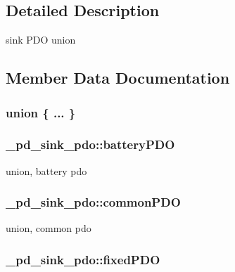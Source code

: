 \subsection{Detailed Description}
sink P\-D\-O union 

\subsection{Member Data Documentation}
\hypertarget{struct__pd__sink__pdo_a9bc2f094f51753cea6adc85552fa8100}{\subsubsection[{"@39}]{\setlength{\rightskip}{0pt plus 5cm}union \{ ... \} }}\label{struct__pd__sink__pdo_a9bc2f094f51753cea6adc85552fa8100}
\hypertarget{struct__pd__sink__pdo_adb7ddc7d4451cd6fe0f6eb13ebce229e}{
\subsubsection[{battery\-P\-D\-O}]{ \-\_\-pd\-\_\-sink\-\_\-pdo\-::battery\-P\-D\-O}}\label{struct__pd__sink__pdo_adb7ddc7d4451cd6fe0f6eb13ebce229e}
union, battery pdo \hypertarget{struct__pd__sink__pdo_a8f6789929499a63a1326708206e016c5}{
\subsubsection[{common\-P\-D\-O}]{ \-\_\-pd\-\_\-sink\-\_\-pdo\-::common\-P\-D\-O}}\label{struct__pd__sink__pdo_a8f6789929499a63a1326708206e016c5}
union, common pdo \hypertarget{struct__pd__sink__pdo_aebd2d1f5078757ee9a4c3d836e0df136}{
\subsubsection[{fixed\-P\-D\-O}]{ \-\_\-pd\-\_\-sink\-\_\-pdo\-::fixed\-P\-D\-O}}\label{struct__pd__sink__pdo_aebd2d1f5078757ee9a4c3d836e0df136}
